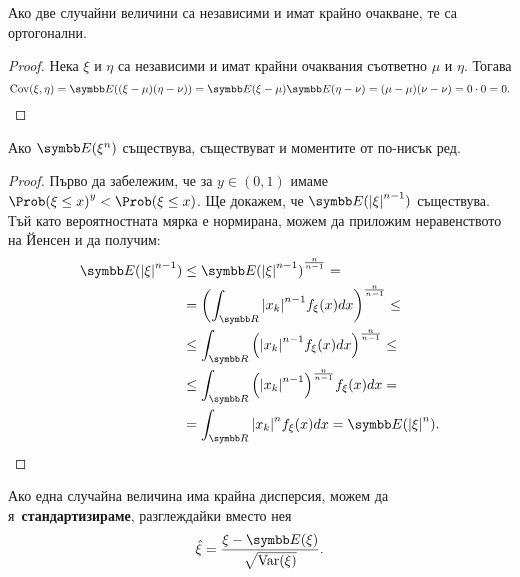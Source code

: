 \documentclass[numbers=endperiod, bibliography=totocnumbered]{scrartcl}
\begin{document}
\begin{proposition}\label{thm:independence_implies_orthogonality}
  Ако две случайни величини са независими и имат крайно очакване, те са ортогонални.
\end{proposition}
\begin{proof}
  Нека \( \xi \) и \( \eta \) са независими и имат крайни очаквания съответно \( \mu \) и \( \eta \). Тогава
  \begin{equation*}
    \Cov(\xi, \eta)
    =
    \Expect((\xi - \mu) (\eta - \nu))
    =
    \Expect(\xi - \mu) \Expect(\eta - \nu)
    =
    (\mu - \mu) (\nu - \nu)
    =
    0 \cdot 0
    =
    0.
  \end{equation*}
\end{proof}

\begin{proposition}\label{thm:lower_order_moments_exist}
  Ако \( \Expect(\xi^n) \) съществува, съществуват и моментите от по-нисък ред.
\end{proposition}
\begin{proof}
  Първо да забележим, че за \( y \in (0, 1) \) имаме \( {\Prob(\xi \leq x)}^y < \Prob(\xi \leq x) \). Ще докажем, че \( \Expect({\Abs{\xi}}^{n-1}) \) съществува. Тъй като вероятностната мярка е нормирана, можем да приложим неравенството на Йенсен и да получим:
  \begin{align*}
    \Expect({\Abs{\xi}}^{n-1})
    &\leq
    {\Expect({\Abs{\xi}}^{n-1})}^{\frac n {n-1}}
    = \\ &=
    {\left( \int_{\R} {\Abs{x_k}}^{n-1} f_\xi(x) dx \right)}^{\frac n {n-1}}
    \leq \\ &\leq
    \int_{\R} {\left({\Abs{x_k}}^{n-1} f_\xi(x) dx \right)}^{\frac n {n-1}}
    \leq \\ &\leq
    \int_{\R} {\left({\Abs{x_k}}^{n-1} \right)}^{\frac n {n-1}} f_\xi(x) dx
    = \\ &=
    \int_{\R} {\Abs{x_k}}^n f_\xi(x) dx
    =
    \Expect({\Abs{\xi}}^n).
  \end{align*}
\end{proof}

\begin{definition}
  Ако една случайна величина има крайна дисперсия, можем да я~\textbf{стандартизираме}, разглеждайки вместо нея
  \begin{equation*}
    \hat \xi = \frac {\xi - \Expect(\xi)} {\sqrt{\Var(\xi)}}.
  \end{equation*}
\end{definition}
\end{document}
